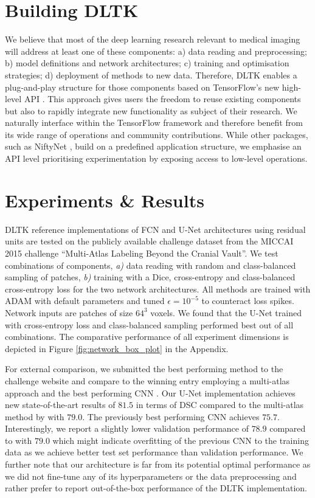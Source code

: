\documentclass{article}
\begin{document}
\section{Building DLTK}
We believe that most of the deep learning research relevant to medical imaging will address at least one of these components: a) data reading and preprocessing; b) model definitions and network architectures; c) training and optimisation strategies; d) deployment of methods to new data.
Therefore, DLTK enables a plug-and-play structure for those components based on TensorFlow's \cite{Abadi2015} new high-level API \cite{cheng2017tensorflow}. This approach gives users the freedom to reuse existing components but also to rapidly integrate new functionality as subject of their research. We naturally interface within the TensorFlow framework and therefore benefit from its wide range of operations and community contributions. While other packages, such as NiftyNet \cite{niftynet17}, build on a predefined application structure, we emphasise an API level prioritising experimentation by exposing access to low-level operations. 

\section{Experiments \& Results}
DLTK reference implementations of FCN \cite{Long2015} and U-Net \cite{Ronneberger2015} architectures using residual units \cite{He2015} are tested on the publicly available challenge dataset from the MICCAI 2015 challenge ``Multi-Atlas Labeling Beyond the Cranial Vault''. We test combinations of components, \textit{a)} data reading with random and class-balanced sampling of patches, \textit{b)} training with a Dice, cross-entropy and class-balanced cross-entropy loss for the two network architectures. All methods are trained with ADAM \cite{Kingma2014} with default parameters and tuned $\hat{\epsilon}=10^{-5}$ to counteract loss spikes. Network inputs are patches of size $64^{3}$ voxels. We found that the U-Net trained with cross-entropy loss and class-balanced sampling performed best out of all combinations. The comparative performance of all experiment dimensions is depicted in Figure \ref{fig:network_box_plot} in the Appendix.

For external comparison, we submitted the best performing method to the challenge website and compare to the winning entry employing a multi-atlas approach \cite{heinrichmulti} and the best performing CNN \cite{Larsson2017}. Our U-Net implementation achieves new state-of-the-art results of $81.5$ in terms of DSC compared to the multi-atlas method by \cite{heinrichmulti} with $79.0$. The previously best performing CNN \cite{Larsson2017} achieves $75.7$. Interestingly, we report a slightly lower validation performance of $78.9$ compared to \cite{Larsson2017} with $79.0$ which might indicate overfitting of the previous CNN \cite{Larsson2017} to the training data as we achieve better test set performance than validation performance. We further note that our architecture is far from its potential optimal performance as we did not fine-tune any of its hyperparameters or the data preprocessing and rather prefer to report out-of-the-box performance of the DLTK implementation.
\end{document}
